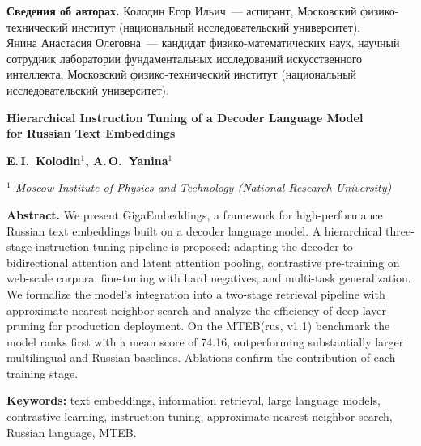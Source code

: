 \documentclass[12pt,a4paper]{article}
\begin{document}
\medskip
\noindent\textbf{Сведения об авторах.}
Колодин Егор Ильич~--- аспирант, Московский физико-технический институт
(национальный исследовательский университет). \\
Янина Анастасия Олеговна~--- кандидат физико-математических наук, научный
сотрудник лаборатории фундаментальных исследований искусственного интеллекта,
Московский физико-технический институт (национальный исследовательский
университет).

\bigskip
\begin{center}
  {\large\bfseries Hierarchical Instruction Tuning of a Decoder Language Model\\
  for Russian Text Embeddings}

  \medskip
  {\bfseries E.\,I.~Kolodin$^{1}$, A.\,O.~Yanina$^{1}$}

  \smallskip
  {\itshape $^{1}$ Moscow Institute of Physics and Technology (National Research University)}
\end{center}

\medskip
\noindent\textbf{Abstract.} %
We present GigaEmbeddings, a framework for high-performance Russian text
embeddings built on a decoder language model. A hierarchical three-stage
instruction-tuning pipeline is proposed: adapting the decoder to bidirectional
attention and latent attention pooling, contrastive pre-training on web-scale
corpora, fine-tuning with hard negatives, and multi-task generalization. We
formalize the model's integration into a two-stage retrieval pipeline with
approximate nearest-neighbor search and analyze the efficiency of deep-layer
pruning for production deployment. On the MTEB(rus, v1.1) benchmark the model
ranks first with a mean score of 74.16, outperforming substantially larger
multilingual and Russian baselines. Ablations confirm the contribution of each
training stage.

\medskip
\noindent\textbf{Keywords:} text embeddings, information retrieval, large language
models, contrastive learning, instruction tuning, approximate nearest-neighbor
search, Russian language, MTEB.

\end{document}
